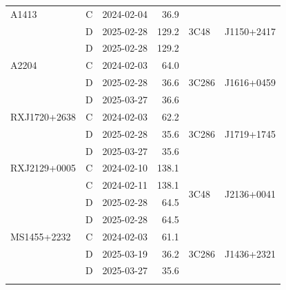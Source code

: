 \begin{table}[p]
\begin{threeparttable}
\begin{tabular}{@{}l c l r l l@{}}
                A1413         & C & 2024-02-04 & 36.9  & \multirow{3}{*}{3C48}  & \multirow{3}{*}{J1150+2417} \\
                            & D & 2025-02-28 & 129.2 &                        &                             \\
                            & D & 2025-02-28 & 129.2 &                        &                             \\
                \addlinespace[0.25em]

                A2204         & C & 2024-02-03 & 64.0  & \multirow{3}{*}{3C286} & \multirow{3}{*}{J1616+0459} \\
                            & D & 2025-02-28 & 36.6  &                        &                             \\
                            & D & 2025-03-27 & 36.6  &                        &                             \\
                \addlinespace[0.25em]

                RXJ1720+2638  & C & 2024-02-03 & 62.2  & \multirow{3}{*}{3C286} & \multirow{3}{*}{J1719+1745} \\
                            & D & 2025-02-28 & 35.6  &                        &                             \\
                            & D & 2025-03-27 & 35.6  &                        &                             \\
                \addlinespace[0.25em]

                RXJ2129+0005  & C & 2024-02-10 & 138.1 & \multirow{4}{*}{3C48}  & \multirow{4}{*}{J2136+0041} \\
                            & C & 2024-02-11 & 138.1 &                        &                             \\
                            & D & 2025-02-28 & 64.5  &                        &                             \\
                            & D & 2025-02-28 & 64.5  &                        &                             \\
                \addlinespace[0.25em]

                MS1455+2232   & C & 2024-02-03 & 61.1  & \multirow{3}{*}{3C286} & \multirow{3}{*}{J1436+2321} \\
                            & D & 2025-03-19 & 36.2  &                        &                             \\
                            & D & 2025-03-27 & 35.6  &                        &                             \\
                \addlinespace[0.25em]


\end{tabular}
\end{threeparttable}
\end{table}
